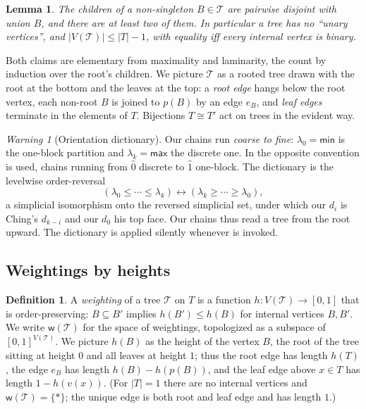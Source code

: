 \documentclass[12pt]{amsart}
\newtheorem{lemma}[subsection]{Lemma}
\theoremstyle{definition}
\newtheorem{definition}[subsection]{Definition}
\theoremstyle{remark}
\newtheorem{warning}[subsection]{Warning}
\newcommand{\TreeF}{\mathcal{T}}                 %
\newcommand{\wt}{\mathsf{w}}                     %
\begin{document}
\begin{lemma}\label{lem:laminar-facts}
The children of a non-singleton $B\in\TreeF$ are pairwise disjoint with union $B$, and there are at least two of them. In particular a tree has no ``unary vertices'', and $|V(\TreeF)|\leq |T|-1$, with equality iff every internal vertex is binary.
\end{lemma}

Both claims are elementary from maximality and laminarity, the count by induction over the root's children. We picture $\TreeF$ as a rooted tree drawn with the root at the bottom and the leaves at the top: a \emph{root edge} hangs below the root vertex, each non-root $B$ is joined to $p(B)$ by an edge $e_B$, and \emph{leaf edges} terminate in the elements of $T$. Bijections $T\cong T'$ act on trees in the evident way.

\begin{warning}[Orientation dictionary]\label{warn:reversal}
Our chains run \emph{coarse to fine}: $\lambda_0=\mathsf{min}$ is the one-block partition and $\lambda_k=\mathsf{max}$ the discrete one. In \cite{Ching-thesis} the opposite convention is used, chains running from $\hat{0}$ discrete to $\hat{1}$ one-block. The dictionary is the levelwise order-reversal
\[ (\lambda_0\leq \cdots \leq \lambda_k) \longleftrightarrow (\lambda_k\geq \cdots \geq \lambda_0), \]
a simplicial isomorphism onto the reversed simplicial set, under which our $d_i$ is Ching's $d_{k-i}$ and our $d_0$ his top face. Our chains thus read a tree from the root upward. The dictionary is applied silently whenever \cite{Ching-thesis} is invoked.
\end{warning}

\subsection{Weightings by heights}\label{sec:weightings}

\begin{definition}\label{def:weighting}
A \emph{weighting} of a tree $\TreeF$ on $T$ is a function $h\colon V(\TreeF)\to [0,1]$ that is order-preserving: $B\subseteq B'$ implies $h(B')\leq h(B)$ for internal vertices $B, B'$. We write $\wt(\TreeF)$ for the space of weightings, topologized as a subspace of $[0,1]^{V(\TreeF)}$. We picture $h(B)$ as the height of the vertex $B$, the root of the tree sitting at height $0$ and all leaves at height $1$; thus the root edge has length $h(T)$, the edge $e_B$ has length $h(B)-h(p(B))$, and the leaf edge above $x\in T$ has length $1 - h(v(x))$. (For $|T|=1$ there are no internal vertices and $\wt(\TreeF)=\{*\}$; the unique edge is both root and leaf edge and has length $1$.)
\end{definition}
\end{document}
